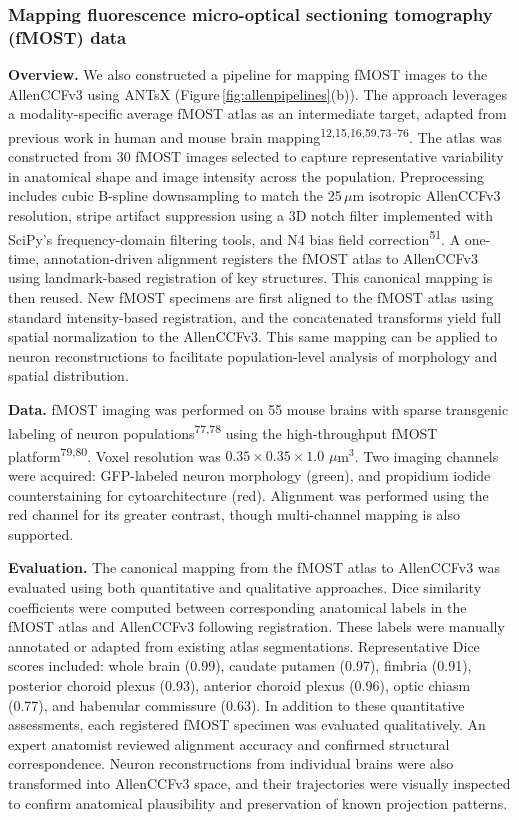 \documentclass[
  12pt,
]{article}
\begin{document}
\subsubsection{Mapping fluorescence micro-optical sectioning tomography
(fMOST)
data}\label{mapping-fluorescence-micro-optical-sectioning-tomography-fmost-data}

\textbf{Overview.} We also constructed a pipeline for mapping fMOST
images to the AllenCCFv3 using ANTsX
(Figure\,\ref{fig:allenpipelines}(b)). The approach leverages a
modality-specific average fMOST atlas as an intermediate target, adapted
from previous work in human and mouse brain
mapping\textsuperscript{12,15,16,59,73--76}. The atlas was constructed
from 30 fMOST images selected to capture representative variability in
anatomical shape and image intensity across the population.
Preprocessing includes cubic B-spline downsampling to match the
25\,\(\mu\)m isotropic AllenCCFv3 resolution, stripe artifact
suppression using a 3D notch filter implemented with SciPy's
frequency-domain filtering tools, and N4 bias field
correction\textsuperscript{51}. A one-time, annotation-driven alignment
registers the fMOST atlas to AllenCCFv3 using landmark-based
registration of key structures. This canonical mapping is then reused.
New fMOST specimens are first aligned to the fMOST atlas using standard
intensity-based registration, and the concatenated transforms yield full
spatial normalization to the AllenCCFv3. This same mapping can be
applied to neuron reconstructions to facilitate population-level
analysis of morphology and spatial distribution.

\textbf{Data.} fMOST imaging was performed on 55 mouse brains with
sparse transgenic labeling of neuron populations\textsuperscript{77,78}
using the high-throughput fMOST platform\textsuperscript{79,80}. Voxel
resolution was \(0.35\times 0.35\times 1.0\) \(\mu\)m\(^3\). Two imaging
channels were acquired: GFP-labeled neuron morphology (green), and
propidium iodide counterstaining for cytoarchitecture (red). Alignment
was performed using the red channel for its greater contrast, though
multi-channel mapping is also supported.

\textbf{Evaluation.} The canonical mapping from the fMOST atlas to
AllenCCFv3 was evaluated using both quantitative and qualitative
approaches. Dice similarity coefficients were computed between
corresponding anatomical labels in the fMOST atlas and AllenCCFv3
following registration. These labels were manually annotated or adapted
from existing atlas segmentations. Representative Dice scores included:
whole brain (0.99), caudate putamen (0.97), fimbria (0.91), posterior
choroid plexus (0.93), anterior choroid plexus (0.96), optic chiasm
(0.77), and habenular commissure (0.63). In addition to these
quantitative assessments, each registered fMOST specimen was evaluated
qualitatively. An expert anatomist reviewed alignment accuracy and
confirmed structural correspondence. Neuron reconstructions from
individual brains were also transformed into AllenCCFv3 space, and their
trajectories were visually inspected to confirm anatomical plausibility
and preservation of known projection patterns.
\end{document}
